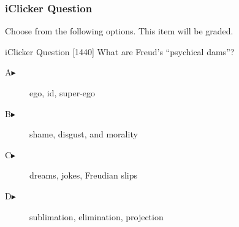 \begin{frame}
  \frametitle{iClicker Question}
Choose from the following options. This item will be graded.
\begin{block}{iClicker Question}
[1440] What are Freud's ``psychical dams''?
\end{block}
\begin{description}
\item[A\hspace{.2in}$\blacktriangleright$] ego, id, super-ego
\item[B\hspace{.2in}$\blacktriangleright$] shame, disgust, and morality
\item[C\hspace{.2in}$\blacktriangleright$] dreams, jokes, Freudian slips
\item[D\hspace{.2in}$\blacktriangleright$] sublimation, elimination, projection
\end{description}
\end{frame}